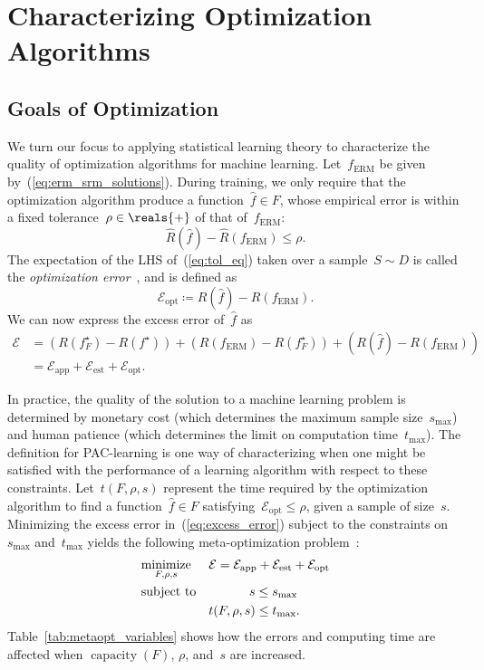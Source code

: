 \documentclass[11pt,a4paper]{article}
\numberwithin{equation}{section}
\newcommand{\capacity}{\operatorname{capacity}}
\newcommand{\apperr}{\mathcal{E}_{\mathrm{app}}}
\newcommand{\esterr}{\mathcal{E}_{\mathrm{est}}}
\newcommand{\opterr}{\mathcal{E}_{\mathrm{opt}}}
\begin{document}
\section{Characterizing Optimization Algorithms}

\subsection{Goals of Optimization}

We turn our focus to applying statistical learning theory to characterize the
quality of optimization algorithms for machine learning. Let~$f_{\text{ERM}}$ be
given by~(\ref{eq:erm_srm_solutions}). During training, we only require that the
optimization algorithm produce a function~$\hat{f} \in F$, whose empirical error
is within a fixed tolerance~$\rho \in \reals{+}$ of that of~$f_{\text{ERM}}$:
\begin{equation}
	\hat{R}(\hat{f}) - \hat{R}(f_{\text{ERM}}) \leq \rho.
	\label{eq:tol_eq}
\end{equation}
The expectation of the LHS of~(\ref{eq:tol_eq}) taken over a sample~$S \sim D$
is called the \emph{optimization error}~\citep{bousquet2008tradeoffs}, and is
defined as
\[
	\opterr \coloneqq R(\hat{f}) - R(f_{\text{ERM}}).
\]
We can now express the excess error of~$\hat{f}$ as
\begin{align}
	\mathcal{E}
	&= (R(f_F^\star) - R(f^\star)) + (R(f_{\text{ERM}}) - R(f_F^\star)) +
		(R(\hat{f}) - R(f_{\text{ERM}})) \\
	&= \apperr + \esterr + \opterr.
	\label{eq:excess_error}
\end{align}

In practice, the quality of the solution to a machine learning problem is
determined by monetary cost (which determines the maximum sample
size~$s_{\text{max}}$) and human patience (which determines the limit on
computation time~$t_{\text{max}}$). The definition for PAC-learning is one way
of characterizing when one might be satisfied with the performance of a learning
algorithm with respect to these constraints. Let~$t(F, \rho, s)$ represent the
time required by the optimization algorithm to find a function~$\hat{f} \in F$
satisfying~$\opterr \leq \rho$, given a sample of size~$s$. Minimizing the
excess error in~(\ref{eq:excess_error}) subject to the constraints
on~$s_{\text{max}}$ and~$t_{\text{max}}$ yields the following meta-optimization
problem~\citep{bousquet2008tradeoffs}:
\begin{equation}
\begin{aligned}
	& \underset{F, \rho, s}{\text{minimize}} & &
		\mathcal{E} = \apperr + \esterr + \opterr \\
	& \text{subject to} & & \hspace{3.2em} s \leq s_{\text{max}} \\
	& & & t(F, \rho, s) \leq t_{\text{max}}.
\end{aligned}
\label{eq:metaopt_program}
\end{equation}
Table~\ref{tab:metaopt_variables} shows how the errors and computing time are
affected when $\capacity(F)$, $\rho$, and~$s$ are increased.
\end{document}
